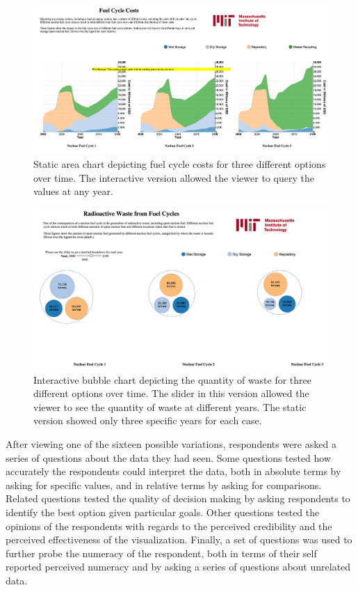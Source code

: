 \begin{figure}[htbp]
\begin{center}
\includegraphics[width=0.7\columnwidth]{./images/viz-area-static-cost}
\caption{Static area chart depicting fuel cycle costs for three different
  options over time.  The interactive version allowed the viewer to query the
  values at any year.}
\end{center}
\label{fig:viz-area-static-cost}
\end{figure}

\begin{figure}[htbp]
\begin{center}
\includegraphics[width=0.7\columnwidth]{./images/viz-bubble-dynamic-waste}
\caption{Interactive bubble chart depicting the quantity of waste for three
  different options over time.  The slider in this version allowed the viewer
  to see the quantity of waste at different years.  The static version showed
  only three specific years for each case.}
\end{center}
\label{fig:viz-bubble-dynamic-waste}
\end{figure}

After viewing one of the sixteen possible variations, respondents were asked a
series of questions about the data they had seen.  Some questions tested how
accurately the respondents could interpret the data, both in absolute terms by
asking for specific values, and in relative terms by asking for comparisons.
Related questions tested the quality of decision making by asking respondents
to identify the best option given particular goals.  Other questions tested
the opinions of the respondents with regards to the perceived credibility and
the perceived effectiveness of the visualization.  Finally, a set of questions
was used to further probe the numeracy of the respondent, both in terms of
their self reported perceived numeracy and by asking a series of questions
about unrelated data.

